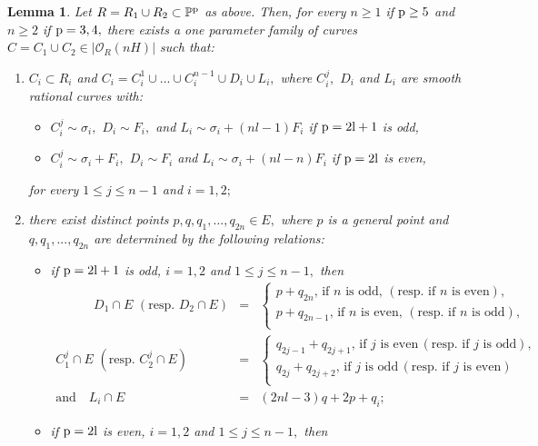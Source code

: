 \documentclass[plain]{amsart}
\newtheorem{lemma}[theorem]{\textbf{Lemma}}
\def\p{\rm{p}}
\begin{document}
\begin{lemma}\label{limiti}
Let $R=R_1\cup R_2\subset\mathbb P^{\p}$ as above. Then, for every $n\geq 1$ if $\p\geq 5$ and 
$n\geq 2$ if $\p=3,4,$ there exists 
a one parameter family of curves
 $C=C_{1}\cup C_{2}\in |\mathcal O_{R}(nH)|$ such that:
 \begin{enumerate}
\item $C_i\subset R_i$ and $C_i=  C_i^1\cup...\cup C_i^{n-1}\cup D_i\cup L_i,$
 where $C_i^j,$ $D_i$ and $L_i$ are smooth rational curves with:
  \begin{itemize}
   \item $C_i^j\sim\sigma_i,$ $D_i\sim F_i,$ and $L_i\sim \sigma_i+(nl-1)F_i$ if $\p=2l+1$ is odd,  
   \item $C_i^j\sim\sigma_i+F_i,$  $D_i\sim F_i$ and $L_i\sim \sigma_i+(nl-n)F_i$ if $\p=2l$ 
   is even,
\end{itemize}
for every $1\leq j\leq n-1$ and $i=1,2;$\\
\item there exist distinct points $p,q,q_1,...,q_{2n}\in E,$ where $p$ is a general point  
and $q,q_1,...,q_{2n}$ are determined by the following relations:
\begin{itemize}
\item if $\p=2l+1$ is odd, $i=1,2$ and $1\leq j\leq n-1,$ then
\begin{eqnarray}
\,\,\,\,\,\,\,\,\,\,\,\,\,\,\,\,\,\,D_1\cap E\,\, (\mbox{resp.}\,\, D_2\cap E)& =&\left\{\begin{array}{l}
p+q_{2n}, \,\mbox{if}\,\, n \,\,\mbox{is odd}, \,(\mbox{resp. if}\,\, n\,\, \mbox{is even}),\\
p+q_{2n-1},\,\mbox{if}\,\, n\,\, \mbox{is even}, \,(\mbox{resp. if}\,\, n\,\, \mbox{is odd}),\\
\end{array}\right.\label{odd1}\\
C_1^j\cap E\,\,(\mbox{resp.}\,\, C_2^j\cap E)&=&\left\{\begin{array}{l}
q_{2j-1}+q_{2j+1},\,\mbox{if}\,\, j \,\,\mbox{is even}\,(\mbox{resp. if}\,\, j\,\, \mbox{is odd}),\\
q_{2j}+q_{2j+2},\,\mbox{if}\,\, j \,\,\mbox{is odd}\,(\mbox{resp. if}\,\, j\,\, \mbox{is even})\\
\end{array}\right. \label{odd2}\\
\mbox{and}\,\,\,\,\,\, L_i\cap E &=& (2nl-3)q+2p+q_i;
\end{eqnarray}
\item if $\p=2l$ is even, $i=1,2$ and $1\leq j\leq n-1,$ then

\end{itemize}
\end{enumerate}
\end{lemma}
\end{document}

